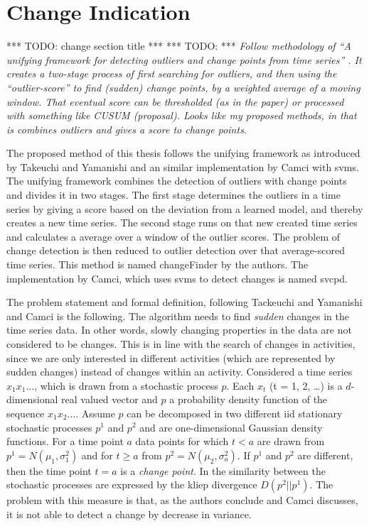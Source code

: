\section{Change Indication}\label{sec:method_change_indication}
*** TODO: change section title ***
*** TODO: ***
\emph{Follow methodology of ``A unifying framework for detecting outliers and change points from time series'' \cite{takeuchi2006unifying}.
It creates a two-stage process of first searching for outliers, and then using the ``outlier-score'' to find (sudden) change points, by a weighted average of a moving window.
That eventual score can be thresholded (as in the paper) or processed with something like CUSUM (proposal).
Looks like my proposed methods, in that is combines outliers and gives a score to change points.}

The proposed method of this thesis follows the unifying framework as introduced by Takeuchi and Yamanishi \cite{takeuchi2006unifying} and an similar implementation by Camci \cite{camci2010change} with \glspl{svm}.
The unifying framework combines the detection of outliers with change points and divides it in two stages.
The first stage determines the outliers in a time series by giving a score based on the deviation from a learned model, and thereby creates a new time series.
The second stage runs on that new created time series and calculates a average over a window of the outlier scores.
The problem of change detection is then reduced to outlier detection over that average-scored time series.
This method is named \gls{changeFinder} by the authors.
The implementation by Camci, which uses \glspl{svm} to detect changes is named \acrlong{svcpd}.

The problem statement and formal definition, following Tackeuchi and Yamanishi \cite{takeuchi2006unifying} and Camci \cite{camci2010change} is the following.
The algorithm needs to find \emph{sudden} changes in the time series data.
In other words, slowly changing properties in the data are not considered to be changes.
This is in line with the search of changes in activities, since we are only interested in different activities (which are represented by sudden changes) instead of changes within an activity.
Considered a time series $x_1 x_1 \dots$, which is drawn from a stochastic process $p$.
Each $x_t$ (t = 1, 2, \dots) is a $d$-dimensional real valued vector and $p$ a probability density function of the sequence $x_1 x_2 \dots$.
Assume $p$ can be decomposed in two different \gls{iid} stationary stochastic processes $p^1$ and $p^2$ and are one-dimensional Gaussian density functions.
For a time point $a$ data points for which $t < a$ are drawn from $p^1 = N(\mu_1, \sigma_1^2)$ and for $t \geq a$ from $p^2 = N(\mu_2, \sigma_a^2)$.
If $p^1$ and $p^2$ are different, then the time point $t = a$ is a \emph{change point}.
In \cite{takeuchi2006unifying} the similarity between the stochastic processes are expressed by the \gls{kliep} divergence $D(p^2||p^1)$.
The problem with this measure is that, as the authors conclude and Camci discusses, it is not able to detect a change by decrease in variance.

